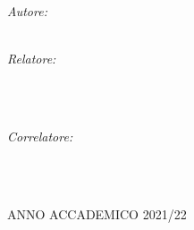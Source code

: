 \begin{titlepage}
\begin{center}
    \begin{minipage}[t]{0.49\textwidth}
    \begin{flushleft} \large
    \emph{Autore:}\\
    \spacedlowsmallcaps{\myName}\\
    \end{flushleft}
    \end{minipage}
    \begin{minipage}[t]{0.49\textwidth}
    \begin{flushright} \large
    \emph{Relatore:} \\
    \\
    \end{flushright}
    \end{minipage}\\[0.5cm]
    \begin{minipage}[t]{0.99\textwidth}
    \begin{flushright} \large
    \emph{Correlatore:} \\
    \\
    \end{flushright}
    \end{minipage}\\[3cm]

    \vfill

    ANNO ACCADEMICO 2021/22

  \end{center}
\end{titlepage}
